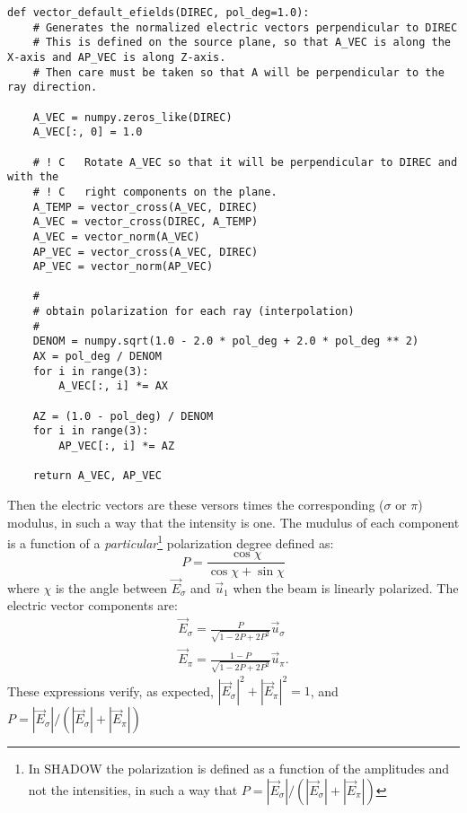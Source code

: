 \documentclass{iucr}
\begin{document}
\begin{lstlisting}[caption={Function {\tt vector\_default\_efields} used to create electric vectors $\sigma$ and $\pi$ perpendicular to a given direction and with a given polarization dregree}, label={lst:vectordefaultefields}, captionpos=b]
def vector_default_efields(DIREC, pol_deg=1.0):
    # Generates the normalized electric vectors perpendicular to DIREC
    # This is defined on the source plane, so that A_VEC is along the X-axis and AP_VEC is along Z-axis.
    # Then care must be taken so that A will be perpendicular to the ray direction.

    A_VEC = numpy.zeros_like(DIREC)
    A_VEC[:, 0] = 1.0

    # ! C   Rotate A_VEC so that it will be perpendicular to DIREC and with the
    # ! C   right components on the plane.
    A_TEMP = vector_cross(A_VEC, DIREC)
    A_VEC = vector_cross(DIREC, A_TEMP)
    A_VEC = vector_norm(A_VEC)
    AP_VEC = vector_cross(A_VEC, DIREC)
    AP_VEC = vector_norm(AP_VEC)

    #
    # obtain polarization for each ray (interpolation)
    #
    DENOM = numpy.sqrt(1.0 - 2.0 * pol_deg + 2.0 * pol_deg ** 2)
    AX = pol_deg / DENOM
    for i in range(3):
        A_VEC[:, i] *= AX

    AZ = (1.0 - pol_deg) / DENOM
    for i in range(3):
        AP_VEC[:, i] *= AZ

    return A_VEC, AP_VEC

\end{lstlisting} 

Then the electric vectors are these versors times the corresponding ($\sigma$ or $\pi$) modulus, in such a way that  the intensity is one. The mudulus of each component is a function of a {\it particular}\footnote{In SHADOW the polarization is defined as a function of the amplitudes and not the intensities, in such a way that $P=|\vec{E}_\sigma|/(|\vec{E}_\sigma|+|\vec{E}_\pi|)$} polarization degree defined as:
\begin{equation}
   P = \frac{\cos \chi}{\cos \chi + \sin \chi}
\end{equation}
where $\chi$ is the angle between $\vec{E}_\sigma$ and $\vec{u}_1$ when the beam is linearly polarized. 
The electric vector components are: 
\begin{eqnarray}
   \vec{E}_\sigma = \frac{P}{\sqrt{1-2 P+ 2 P^2}} \vec{u}_\sigma \nonumber \\
   \vec{E}_\pi    = \frac{1-P}{\sqrt{1-2 P+ 2 P^2}} \vec{u}_\pi.
\end{eqnarray}
These expressions verify, as expected,  $|\vec{E}_\sigma|^2 + |\vec{E}_\pi|^2 = 1$, and $P=|\vec{E}_\sigma|/(|\vec{E}_\sigma|+|\vec{E}_\pi|)$
\end{document}
